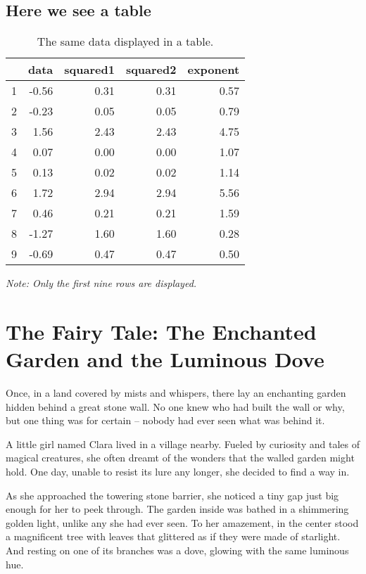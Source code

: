 \documentclass[10pt,fullpage, a4paper, titlepage]{article}
\begin{document}
\subsection{Here we see a table}
\begin{table}[H] %
\centering
\caption{The same data displayed in a table.}
\label{tab:data_summary}
\begin{tabular}{rrrrr}
  \hline
 & data & squared1 & squared2 & exponent \\ 
  \hline
1 & -0.56 & 0.31 & 0.31 & 0.57 \\ 
  2 & -0.23 & 0.05 & 0.05 & 0.79 \\ 
  3 & 1.56 & 2.43 & 2.43 & 4.75 \\ 
  4 & 0.07 & 0.00 & 0.00 & 1.07 \\ 
  5 & 0.13 & 0.02 & 0.02 & 1.14 \\ 
  6 & 1.72 & 2.94 & 2.94 & 5.56 \\ 
  7 & 0.46 & 0.21 & 0.21 & 1.59 \\ 
  8 & -1.27 & 1.60 & 1.60 & 0.28 \\ 
  9 & -0.69 & 0.47 & 0.47 & 0.50 \\ 
   \hline
\end{tabular}
\begin{center}
\textit{Note: Only the first nine rows are displayed.}
\end{center}
\end{table}


\section{The Fairy Tale: The Enchanted Garden and the Luminous Dove}

Once, in a land covered by mists and whispers, there lay an enchanting garden hidden behind a great stone wall. No one knew who had built the wall or why, but one thing was for certain – nobody had ever seen what was behind it.

A little girl named Clara lived in a village nearby. Fueled by curiosity and tales of magical creatures, she often dreamt of the wonders that the walled garden might hold. One day, unable to resist its lure any longer, she decided to find a way in.

As she approached the towering stone barrier, she noticed a tiny gap just big enough for her to peek through. The garden inside was bathed in a shimmering golden light, unlike any she had ever seen. To her amazement, in the center stood a magnificent tree with leaves that glittered as if they were made of starlight. And resting on one of its branches was a dove, glowing with the same luminous hue.
\end{document}
